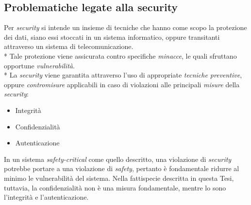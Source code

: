 \subsection{Problematiche legate alla security}
Per \emph{security} si intende un insieme di tecniche che hanno come scopo la protezione dei dati, siano essi stoccati in un sistema informatico, oppure transitanti attraverso un sistema di telecomunicazione.\\*
Tale protezione viene assicurata contro specifiche \emph{minacce}, le quali sfruttano opportune \emph{vulnerabilit\`a}.\\*
La \emph{security} viene garantita attraverso l'uso di appropriate \emph{tecniche preventive}, oppure \emph{contromisure} applicabili in caso di violazioni alle principali \emph{misure} della \emph{security}:
\begin{itemize}
	\item Integrit\`a
	\item Confidenzialit\`a
	\item Autenticazione
\end{itemize}
In un sistema \emph{safety-critical} come quello descritto, una violazione di \emph{security} potrebbe portare a una violazione di \emph{safety}, pertanto \`e fondamentale ridurre al minimo le vulnerabilit\`a del sistema.
Nella fattispecie descritta in questa Tesi, tuttavia, la confidenzialit\`a non \`e una misura fondamentale, mentre lo sono l'integrit\`a e l'autenticazione.

